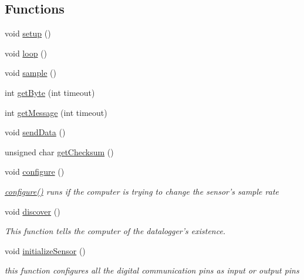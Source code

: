 \subsection*{Functions}
\begin{CompactItemize}
\item 
void \hyperlink{temperature__sensor___terciopelo_8pde_4fc01d736fe50cf5b977f755b675f11d}{setup} ()
\item 
void \hyperlink{temperature__sensor___terciopelo_8pde_fe461d27b9c48d5921c00d521181f12f}{loop} ()
\item 
void \hyperlink{temperature__sensor___terciopelo_8pde_50a2ce599e896bfb535e70a42003ed23}{sample} ()
\item 
int \hyperlink{temperature__sensor___terciopelo_8pde_f8c68e93feeba5b9244094043672bac0}{getByte} (int timeout)
\item 
int \hyperlink{temperature__sensor___terciopelo_8pde_8f2521044963073c55b3c290fffd79e3}{getMessage} (int timeout)
\item 
void \hyperlink{temperature__sensor___terciopelo_8pde_95b1b253ee46df6a93285803cf1f3370}{sendData} ()
\item 
unsigned char \hyperlink{temperature__sensor___terciopelo_8pde_465a79dc430d1e52a5b540920da744ca}{getChecksum} ()
\item 
void \hyperlink{temperature__sensor___terciopelo_8pde_e369b3765489ee8bd0ea791c1843630f}{configure} ()
\begin{CompactList}\small\item\em \hyperlink{nublogger_8h_e369b3765489ee8bd0ea791c1843630f}{configure()} runs if the computer is trying to change the sensor's sample rate \item\end{CompactList}\item 
void \hyperlink{temperature__sensor___terciopelo_8pde_3fdb2350c3f98c0de0f0ae3c831a8b14}{discover} ()
\begin{CompactList}\small\item\em This function tells the computer of the datalogger's existence. \item\end{CompactList}\item 
void \hyperlink{temperature__sensor___terciopelo_8pde_f6c9587ccbcf223f8c79f508c2fef366}{initializeSensor} ()
\begin{CompactList}\small\item\em this function configures all the digital communication pins as input or output pins \item\end{CompactList}\item 

\end{CompactItemize}
